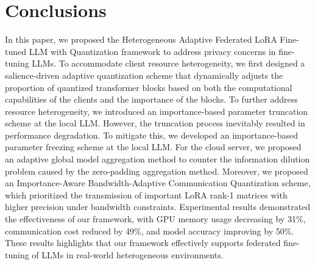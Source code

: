 \documentclass[journal]{IEEEtran}
\begin{document}
\section{Conclusions}
In this paper, we proposed the Heterogeneous Adaptive Federated LoRA
Fine-tuned LLM with Quantization framework to address privacy concerns in fine-tuning LLMs. To accommodate client resource heterogeneity, we first designed a salience-driven adaptive quantization scheme that dynamically adjusts the proportion of quantized transformer blocks based on both the computational capabilities of the clients and the importance of the blocks.
To further address resource heterogeneity, we introduced an importance-based parameter truncation scheme at the local LLM. However, the truncation process inevitably resulted in performance degradation. To mitigate this, we developed an importance-based parameter freezing scheme at the local LLM. For the cloud server, we proposed an adaptive global model aggregation method to counter the information dilution problem caused by the zero-padding aggregation method.
Moreover, we proposed an Importance-Aware Bandwidth-Adaptive Communication Quantization scheme, which prioritized the transmission of important LoRA rank-1 matrices with higher precision under bandwidth constraints.
Experimental results demonstrated the effectiveness of our framework, with GPU memory usage decreasing by 31\%, communication cost reduced by 49\%, and model accuracy improving by 50\%. These results highlights that our framework effectively supports federated fine-tuning of LLMs in real-world heterogeneous environments.





\end{document}
